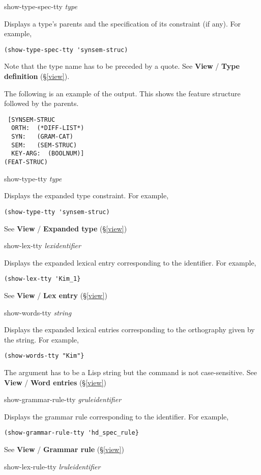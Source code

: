 \documentclass[12pt]{report}
\newcommand{\lispcommand}[1]{\noindent\rm #1}%
\begin{document}
\lispcommand{show-type-spec-tty {\it type}}

Displays a type's parents 
and the specification of its constraint (if any).
For example,
\begin{verbatim}
(show-type-spec-tty 'synsem-struc)
\end{verbatim}
Note that the type name has to be preceded by a quote.
See {\bf View} / {\bf Type definition} (\S\ref{view}).

The following is an example of the output.
This shows the feature structure followed by the
parents.
\begin{verbatim}
 [SYNSEM-STRUC
  ORTH:  (*DIFF-LIST*)
  SYN:   (GRAM-CAT)
  SEM:   (SEM-STRUC)
  KEY-ARG:  (BOOLNUM)]
(FEAT-STRUC)
\end{verbatim}

\lispcommand{show-type-tty {\it type}}

Displays the expanded type constraint.
For example,
\begin{verbatim}
(show-type-tty 'synsem-struc)
\end{verbatim}
See {\bf View} / {\bf Expanded type} (\S\ref{view})

\lispcommand{show-lex-tty {\it lexidentifier}}

Displays the expanded lexical entry corresponding to the identifier.
For example,
\begin{verbatim}
(show-lex-tty 'Kim_1}
\end{verbatim}
See {\bf View} / {\bf Lex entry} (\S\ref{view})

\lispcommand{show-words-tty {\it string}}

Displays the expanded lexical entries corresponding to the 
orthography given by the string.
For example,
\begin{verbatim}
(show-words-tty "Kim"}
\end{verbatim}
The argument has to be a Lisp string but the command is
not case-sensitive.
See {\bf View} / {\bf Word entries} (\S\ref{view})

\lispcommand{show-grammar-rule-tty {\it gruleidentifier}}

Displays the grammar rule corresponding to the identifier.
For example,
\begin{verbatim}
(show-grammar-rule-tty 'hd_spec_rule}
\end{verbatim}
See {\bf View} / {\bf Grammar rule} (\S\ref{view})

\lispcommand{show-lex-rule-tty {\it lruleidentifier}}
\end{document}
